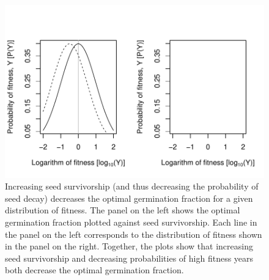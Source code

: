 \documentclass[12pt, oneside, titlepage]{article}   	%
\begin{document}
 \begin{figure}[h]
   \centering
       \includegraphics[page=1]{../figures/appendix-x-survivorship.pdf}  
    \caption{ Increasing seed survivorship (and thus decreasing the probability of seed decay) decreases the optimal germination fraction for a given distribution of fitness. The panel on the left shows the optimal germination fraction plotted against seed survivorship. Each line in the panel on the left corresponds to the distribution of fitness shown in the panel on the right. Together, the plots show that increasing seed survivorship and decreasing probabilities of high fitness years both decrease the optimal germination fraction. }
 \label{fig:survivorship}
\end{figure}
\end{document}
